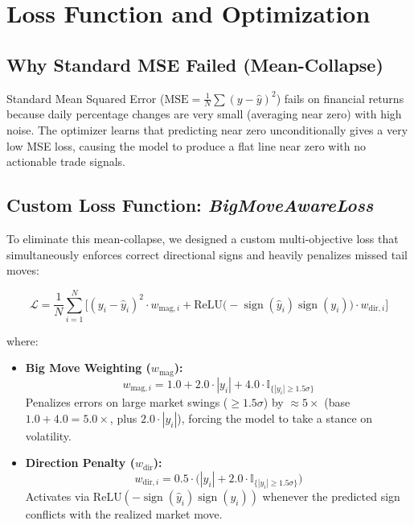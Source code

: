 \documentclass[11pt,oneside,letterpaper,english]{article}
\begin{document}
\section{Loss Function and Optimization}

\subsection{Why Standard MSE Failed (Mean-Collapse)}
Standard Mean Squared Error ($\text{MSE} = \frac{1}{N}\sum (y - \hat{y})^2$) fails on financial returns because daily percentage changes are very small (averaging near zero) with high noise. The optimizer learns that predicting near zero unconditionally gives a very low MSE loss, causing the model to produce a flat line near zero with no actionable trade signals.

\subsection{Custom Loss Function: \textit{BigMoveAwareLoss}}
To eliminate this mean-collapse, we designed a custom multi-objective loss that simultaneously enforces correct directional signs and heavily penalizes missed tail moves:

\begin{equation}
	\mathcal{L} = \frac{1}{N}\sum_{i=1}^N \Big[ (y_i - \hat{y}_i)^2 \cdot w_{\text{mag}, i} + \text{ReLU}\big(-\operatorname{sign}(\hat{y}_i)\operatorname{sign}(y_i)\big) \cdot w_{\text{dir}, i} \Big]
\end{equation}

where:
\begin{itemize}[leftmargin=1.2cm, itemsep=2pt]
	\item \textbf{Big Move Weighting ($w_{\text{mag}}$):}
	\begin{equation}
		w_{\text{mag}, i} = 1.0 + 2.0 \cdot |y_i| + 4.0 \cdot \mathbb{I}_{\{|y_i| \ge 1.5\sigma\}}
	\end{equation}
	Penalizes errors on large market swings ($\ge 1.5\sigma$) by $\approx 5\times$ (base $1.0 + 4.0 = 5.0\times$, plus $2.0 \cdot |y_i|$), forcing the model to take a stance on volatility.
	\item \textbf{Direction Penalty ($w_{\text{dir}}$):}
	\begin{equation}
		w_{\text{dir}, i} = 0.5 \cdot \Big( |y_i| + 2.0 \cdot \mathbb{I}_{\{|y_i| \ge 1.5\sigma\}} \Big)
	\end{equation}
	Activates via $\text{ReLU}(-\operatorname{sign}(\hat{y}_i)\operatorname{sign}(y_i))$ whenever the predicted sign conflicts with the realized market move.
\end{itemize}
\end{document}
